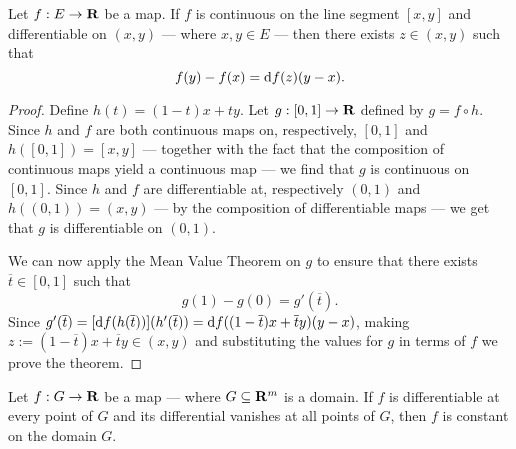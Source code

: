\begin{theorem}
  \label{thm: several-mvt-real-val}
  Let \(f: E \to \mathbf{R}\) be a map. If \(f\) is continuous on the line segment \([x,
  y]\) and differentiable on \((x, y)\) --- where \(x, y \in E\) --- then there
  exists \(z \in (x, y)\) such that
  \[
    f(y) - f(x) = \mathrm{d} f(z)(y - x).
  \]
\end{theorem}

\begin{proof}
  Define \(h(t) = (1 - t) x + ty\). Let \(g: [0, 1] \to \mathbf{R}\) defined by \(g = f
  \circ h\). Since \(h\) and \(f\) are both continuous maps on, respectively,
  \([0, 1]\) and \(h([0, 1]) = [x, y]\) --- together with the fact that the
  composition of continuous maps yield a continuous map --- we find that \(g\)
  is continuous on \([0, 1]\). Since \(h\) and \(f\) are differentiable at,
  respectively \((0, 1)\) and \(h((0, 1)) = (x, y)\) --- by the composition of
  differentiable maps --- we get that \(g\) is differentiable on \((0, 1)\).

  We can now apply the Mean Value Theorem on \(g\) to ensure that there exists
  \(\overline t \in [0, 1]\) such that
  \[
    g(1) - g(0) = g'(\overline t).
  \]
  Since \(g'(\overline t) = [\mathrm{d} f(h(\overline t))](h'(\overline t)) = \mathrm{d}
  f((1 -\overline t) x + \overline t y)(y - x)\), making \(z := (1 - \overline
  t)x + \overline t y \in (x, y)\) and substituting the values for \(g\) in
  terms of \(f\) we prove the theorem.
\end{proof}

\begin{corollary}\label{cor: sev-const}
  Let \(f: G \to \mathbf{R}\) be a map --- where \(G \subseteq \mathbf{R}^m\) is a domain. If
  \(f\) is differentiable at every point of \(G\) and its differential vanishes
  at all points of \(G\), then \(f\) is constant on the domain \(G\).
\end{corollary}

